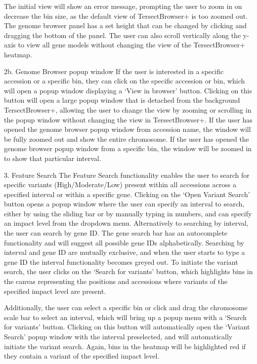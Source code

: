 \documentclass[12pt]{article}
\begin{document}
The initial view will show an error message, prompting the user to zoom in on decrease the bin size, as the default view of TersectBrowser+ is too zoomed out. The genome browser panel has a set height that can be changed by clicking and dragging the bottom of the panel. The user can also scroll vertically along the y-axis to view all gene models without changing the view of the TersectBrowser+ heatmap. 

2b. Genome Browser popup window
If the user is interested in a specific accession or a specific bin, they can click on the specific accession or bin, which will open a popup window displaying a `View in browser' button. Clicking on this button will open a large popup window that is detached from the background TersectBrowser+, allowing the user to change the view by zooming or scrolling in the popup window without changing the view in TersectBrowser+. If the user has opened the genome browser popup window from accession name, the window will be fully zoomed out and show the entire chromosome. If the user has opened the genome browser popup window from a specific bin, the window will be zoomed in to show that particular interval. 

3. Feature Search
The Feature Search functionality enables the user to search for specific variants (High/Moderate/Low) present within all accessions across a specified interval or within a specific gene. Clicking on the `Open Variant Search' button opens a popup window where the user can specify an interval to search, either by using the sliding bar or by manually typing in numbers, and can specify an impact level from the dropdown menu. Alternatively to searching by interval, the user can search by gene ID. The gene search bar has an autocomplete functionality and will suggest all possible gene IDs alphabetically. Searching by interval and gene ID are mutually exclusive, and when the user starts to type a gene ID the interval functionality becomes greyed out. To initiate the variant search, the user clicks on the `Search for variants' button, which highlights bins in the canvas representing the positions and accessions where variants of the specified impact level are present.

Additionally, the user can select a specific bin or click and drag the chromosome scale bar to select an interval, which will bring up a popup menu with a `Search for variants' button. Clicking on this button will automatically open the `Variant Search' popup window with the interval preselected, and will automatically initiate the variant search. Again, bins in the heatmap will be highlighted red if they contain a variant of the specified impact level.
\end{document}
